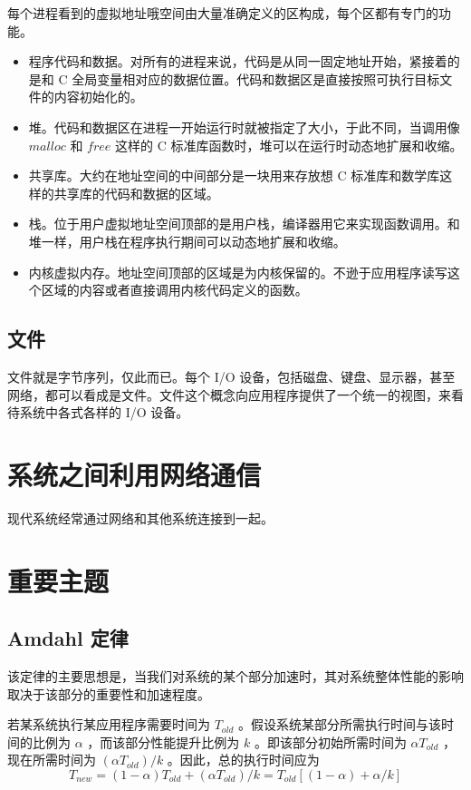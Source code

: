 每个进程看到的虚拟地址哦空间由大量准确定义的区构成，每个区都有专门的功能。

\begin{itemize}
    \item 程序代码和数据。对所有的进程来说，代码是从同一固定地址开始，紧接着的是和 C 全局变量相对应的数据位置。代码和数据区是直接按照可执行目标文件的内容初始化的。
    \item 堆。代码和数据区在进程一开始运行时就被指定了大小，于此不同，当调用像 $malloc$ 和 $free$ 这样的 C 标准库函数时，堆可以在运行时动态地扩展和收缩。
    \item 共享库。大约在地址空间的中间部分是一块用来存放想 C 标准库和数学库这样的共享库的代码和数据的区域。
    \item 栈。位于用户虚拟地址空间顶部的是用户栈，编译器用它来实现函数调用。和堆一样，用户栈在程序执行期间可以动态地扩展和收缩。
    \item 内核虚拟内存。地址空间顶部的区域是为内核保留的。不逊于应用程序读写这个区域的内容或者直接调用内核代码定义的函数。
\end{itemize}

\subsection{文件}

文件就是字节序列，仅此而已。每个 I/O 设备，包括磁盘、键盘、显示器，甚至网络，都可以看成是文件。文件这个概念向应用程序提供了一个统一的视图，来看待系统中各式各样的 I/O 设备。

\section{系统之间利用网络通信}

现代系统经常通过网络和其他系统连接到一起。

\section{重要主题}

\subsection{Amdahl 定律}

该定律的主要思想是，当我们对系统的某个部分加速时，其对系统整体性能的影响取决于该部分的重要性和加速程度。

若某系统执行某应用程序需要时间为 $T_{old}$ 。假设系统某部分所需执行时间与该时间的比例为 $\alpha$ ，而该部分性能提升比例为 $k$ 。即该部分初始所需时间为 $\alpha T_{old}$ ，现在所需时间为 $(\alpha T_{old}) / k$ 。因此，总的执行时间应为
\[
    T_{new} = (1 - \alpha) T_{old} + (\alpha T_{old}) / k = T_{old}[(1 - \alpha) + \alpha / k]
\]

